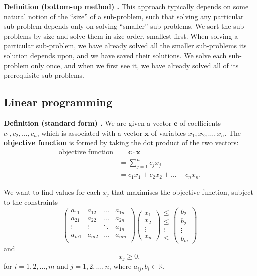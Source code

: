 \begin{shaded}
\textbf{Definition (bottom-up method) \cite{clrs_algorithms}.} This approach typically depends on some natural notion of the ``size'' of a sub-problem, such that solving any particular sub-problem depends only on solving ``smaller'' sub-problems. We sort the sub-problems by size and solve them in size order, smallest first. When solving a particular sub-problem, we have already solved all the smaller sub-problems its solution depends upon, and we have saved their solutions. We  solve each sub-problem only once, and when we first see it, we have already solved all of its prerequisite sub-problems.
\end{shaded}

\subsection{Linear programming}
\begin{shaded}
\textbf{Definition (standard form) \cite{clrs_algorithms}.} We are given a vector $\mathbf{c}$ of coefficients $c_1, c_2, \ldots, c_n$, which is associated with a vector $\mathbf{x}$ of variables $x_1, x_2, \ldots, x_n$. The \textbf{objective function} is formed by taking the dot product of the two vectors:
\begin{align*}
\text{objective function} &= \mathbf{c} \cdot \mathbf{x} \\
&= \sum_{j=1}^{n} c_j x_j \\
&= c_1 x_1 + c_2 x_2 + \ldots + c_n x_n .
\end{align*}

We want to find values for each $x_j$ that maximises the objective function, subject to the constraints
$$
\begin{pmatrix}
a_{11} & a_{12} & \ldots & a_{1n} \\
a_{21} & a_{22} & \ldots & a_{2n} \\
\vdots & \vdots & \ddots & a_{1n} \\
a_{m1} & a_{m2} & \ldots & a_{mn} \\
\end{pmatrix}
\begin{pmatrix} x_1 \\ x_2 \\ \vdots \\ x_n \end{pmatrix}
\begin{matrix} \leq \\ \leq \\ \vdots \\ \leq \end{matrix}
\begin{pmatrix} b_2 \\ b_2 \\ \vdots \\ b_m \end{pmatrix}
$$
and
$$ x_j \geq 0 , $$
for $i = 1, 2, \ldots, m$ and $j = 1, 2, \ldots, n$, where $a_{ij}, b_i \in \mathbb{R}$.

\end{shaded}

